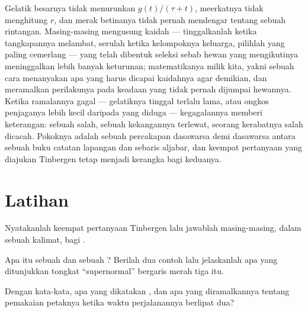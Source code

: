 \begin{remark}\label{rem:b3:behavioural-ecology:remark}
Gelatik besarnya tidak menurunkan $g(t)/(\tau + t)$, meerkatnya tidak
menghitung $r$, dan merak betinanya tidak pernah mendengar tentang sebuah rintangan. Masing-masing
mengusung kaidah --- tinggalkanlah ketika tangkapannya melambat, serulah ketika kelompoknya
keluarga, pilihlah yang paling cemerlang --- yang telah dibentuk seleksi sebab
hewan yang mengikutinya meninggalkan lebih banyak keturunan; matematikanya milik kita,
yakni sebuah cara menanyakan apa yang harus dicapai kaidahnya agar demikian, dan
meramalkan perilakunya pada keadaan yang tidak pernah dijumpai hewannya. Ketika
ramalannya gagal --- gelatiknya tinggal terlalu lama, atau ongkos penjaganya
lebih kecil daripada yang diduga --- kegagalannya memberi keterangan: sebuah 
salah, sebuah kekangannya terlewat, seorang kerabatnya salah dicacah. Pokoknya
adalah sebuah percakapan dasawarsa demi dasawarsa antara sebuah buku catatan lapangan dan
sebaris aljabar, dan keempat pertanyaan yang diajukan Tinbergen tetap menjadi
kerangka bagi keduanya.
\end{remark}

\section{Latihan}

\begin{exercise}[$\star$]\label{exo:b3:behavioural-ecology:1}
Nyatakanlah keempat pertanyaan Tinbergen lalu jawablah masing-masing, dalam sebuah kalimat, bagi
.
\end{exercise}

\begin{exercise}[$\star$]\label{exo:b3:behavioural-ecology:2}
Apa itu sebuah  dan sebuah ? Berilah dua contoh
lalu jelaskanlah apa yang ditunjukkan tongkat ``supernormal'' bergaris merah tiga itu.
\end{exercise}

\begin{exercise}[$\star$]\label{exo:b3:behavioural-ecology:3}
Dengan kata-kata, apa yang dikatakan , dan apa yang
diramalkannya tentang pemakaian petaknya ketika waktu perjalanannya berlipat dua?
\end{exercise}

